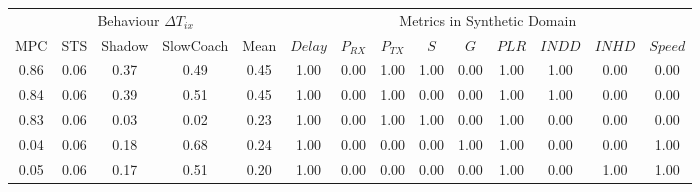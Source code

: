 \begin{tabular}{|*{5}{c|}|*{9}{c|}}
\toprule
\multicolumn{5}{|c||}{Behaviour $\Delta T_{ix}$} & \multicolumn{9}{c|}{Metrics in Synthetic Domain}\\
               MPC &  STS & Shadow & SlowCoach & Mean &                     $Delay$ & $P_{RX}$ & $P_{TX}$ &  $S$ &  $G$ & $PLR$ & $INDD$ & $INHD$ & $Speed$ \\
\midrule
              0.86 & 0.06 &   0.37 &      0.49 & 0.45 &                        1.00 &     0.00 &     1.00 & 1.00 & 0.00 &  1.00 &   1.00 &   0.00 &    0.00 \\
              0.84 & 0.06 &   0.39 &      0.51 & 0.45 &                        1.00 &     0.00 &     1.00 & 0.00 & 0.00 &  1.00 &   1.00 &   0.00 &    0.00 \\
              0.83 & 0.06 &   0.03 &      0.02 & 0.23 &                        1.00 &     0.00 &     1.00 & 1.00 & 0.00 &  1.00 &   0.00 &   0.00 &    0.00 \\
              0.04 & 0.06 &   0.18 &      0.68 & 0.24 &                        1.00 &     0.00 &     0.00 & 0.00 & 1.00 &  1.00 &   0.00 &   0.00 &    1.00 \\
              0.05 & 0.06 &   0.17 &      0.51 & 0.20 &                        1.00 &     0.00 &     0.00 & 0.00 & 0.00 &  1.00 &   0.00 &   1.00 &    1.00 \\
\bottomrule
\end{tabular}
